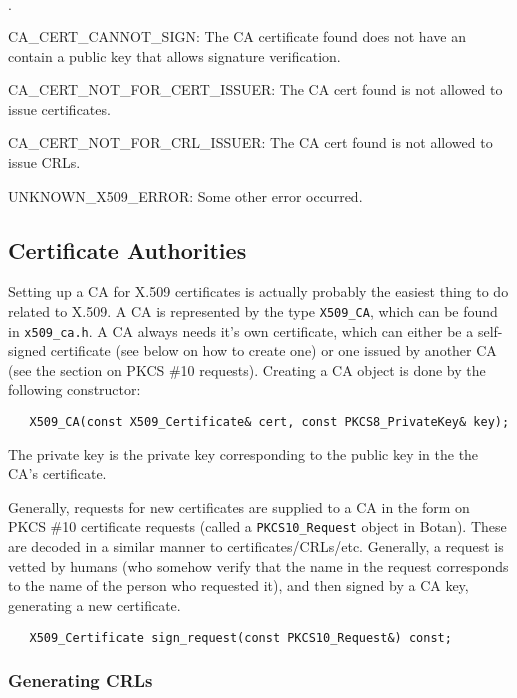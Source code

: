 \documentclass{article}
\newcommand{\filename}[1]{\texttt{#1}}
\newcommand{\type}[1]{\texttt{#1}}
\begin{document}
\begin{list}{$\cdot$}
   \item CA\_CERT\_CANNOT\_SIGN: The CA certificate found does not have an
         contain a public key that allows signature verification.
   \item CA\_CERT\_NOT\_FOR\_CERT\_ISSUER: The CA cert found is not allowed to
         issue certificates.
   \item CA\_CERT\_NOT\_FOR\_CRL\_ISSUER: The CA cert found is not allowed to
         issue CRLs.

  \item UNKNOWN\_X509\_ERROR: Some other error occurred.

\end{list}

\subsection{Certificate Authorities}

Setting up a CA for X.509 certificates is actually probably the easiest thing
to do related to X.509. A CA is represented by the type \type{X509\_CA}, which
can be found in \filename{x509\_ca.h}. A CA always needs it's own certificate,
which can either be a self-signed certificate (see below on how to create one)
or one issued by another CA (see the section on PKCS \#10 requests). Creating
a CA object is done by the following constructor:

\begin{verbatim}
   X509_CA(const X509_Certificate& cert, const PKCS8_PrivateKey& key);
\end{verbatim}

The private key is the private key corresponding to the public key in the the
CA's certificate.

Generally, requests for new certificates are supplied to a CA in the form on
PKCS \#10 certificate requests (called a \type{PKCS10\_Request} object in
Botan). These are decoded in a similar manner to
certificates/CRLs/etc. Generally, a request is vetted by humans (who somehow
verify that the name in the request corresponds to the name of the person who
requested it), and then signed by a CA key, generating a new certificate.

\begin{verbatim}
   X509_Certificate sign_request(const PKCS10_Request&) const;
\end{verbatim}

\subsubsection{Generating CRLs}
\end{document}
